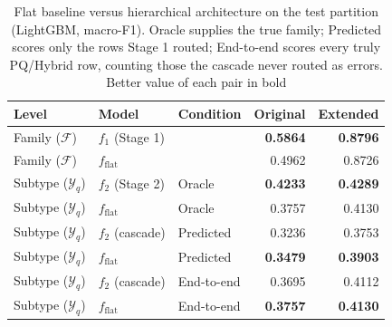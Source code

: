 \begin{table}[!t]
\caption{Flat baseline versus hierarchical architecture on the test partition
(LightGBM, macro-F1). Oracle supplies the true family; Predicted scores only
the rows Stage 1 routed; End-to-end scores every truly PQ/Hybrid row, counting
those the cascade never routed as errors. Better value of each pair in bold}
\label{tab:flat_vs_hier}
\centering
\small
\begin{tabular}{lllrr}
\toprule
Level & Model & Condition & Original & Extended \\
\midrule
Family ($\mathcal{F}$) & $f_1$ (Stage 1) &  & \textbf{0.5864} & \textbf{0.8796} \\
Family ($\mathcal{F}$) & $f_{\mathrm{flat}}$ &  & 0.4962 & 0.8726 \\
\midrule
Subtype ($\mathcal{Y}_q$) & $f_2$ (Stage 2) & Oracle & \textbf{0.4233} & \textbf{0.4289} \\
Subtype ($\mathcal{Y}_q$) & $f_{\mathrm{flat}}$ & Oracle & 0.3757 & 0.4130 \\
\midrule
Subtype ($\mathcal{Y}_q$) & $f_2$ (cascade) & Predicted & 0.3236 & 0.3753 \\
Subtype ($\mathcal{Y}_q$) & $f_{\mathrm{flat}}$ & Predicted & \textbf{0.3479} & \textbf{0.3903} \\
\midrule
Subtype ($\mathcal{Y}_q$) & $f_2$ (cascade) & End-to-end & 0.3695 & 0.4112 \\
Subtype ($\mathcal{Y}_q$) & $f_{\mathrm{flat}}$ & End-to-end & \textbf{0.3757} & \textbf{0.4130} \\
\bottomrule
\end{tabular}
\end{table}
